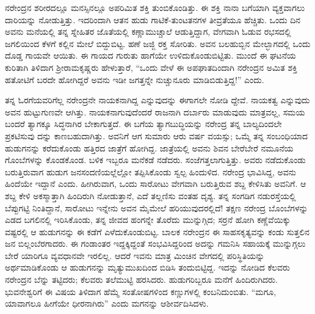 ನರೇಂದ್ರನ ಶರೀರದಲ್ಲೂ ಮನಸ್ಸಿನಲ್ಲೂ ಅಪರಿಮಿತ ಶಕ್ತಿ ತುಂಬಿಕೊಂಡಿತ್ತು. ಈ ಶಕ್ತಿ ನಾನಾ ಬಗೆಯಾಗಿ ವ್ಯಕ್ತವಾಗಲು ದಾರಿಯನ್ನು ನೋಡುತ್ತಿತ್ತು. ಇದರಿಂದಾಗಿ ಆತನ ಹುಡು ಗಾಟಿಕೆ-ತುಂಟತನಗಳ ತೀವ್ರತೆಯೂ ಹೆಚ್ಚಿತು. ಒಂದು ದಿನ ಅವನು ಮನೆಯಲ್ಲಿ ತನ್ನ ಸ್ನೇಹಿತರ ಜೊತೆಯಲ್ಲಿ ಕಣ್ಣಾಮುಚ್ಚಾಲೆ ಆಡುತ್ತಿದ್ದಾಗ, ವೇಗವಾಗಿ ಓಡುವ ರಭಸದಲ್ಲಿ ಜಗಲಿಯಿಂದ ಕೆಳಗೆ ಕಲ್ಲಿನ ಮೇಲೆ ಬಿದ್ದುಬಿಟ್ಟ. ಹಣೆ ಜಜ್ಜಿ ರಕ್ತ ಸೋರಿತು. ಅವನ ಬಲಹುಬ್ಬಿನ ಮೇಲ್ಭಾಗದಲ್ಲಿ ಒಂದು ದೊಡ್ಡ ಗಾಯವೇ ಆಯಿತು. ಈ ಗಾಯದ ಗುರುತು ಹಾಗೆಯೇ ಉಳಿದುಕೊಂಡುಬಿಟ್ಟಿತು. ಮುಂದೆ ಈ ಘಟನೆಯ ಕುರಿತಾಗಿ ತಿಳಿದಾಗ ಶ್ರೀರಾಮಕೃಷ್ಣರು ಹೇಳುತ್ತಾರೆ, “ಒಂದು ವೇಳೆ ಈ ಅಪಘಾತದಿಂದಾಗಿ ನರೇಂದ್ರನ ಅಮಿತ ಶಕ್ತಿ ಹತೋಟಿಗೆ ಬರದೇ ಹೋಗಿದ್ದರೆ ಅವನು ಇಡೀ ಜಗತ್ತನ್ನೇ ನುಚ್ಚುನೂರು ಮಾಡಿಬಿಡುತ್ತಿದ್ದ!” ಎಂದು.

ತನ್ನ ಓರಗೆಯವರಿಗೆಲ್ಲ ನರೇಂದ್ರನೇ ನಾಯಕನಾಗಿದ್ದ ಎನ್ನುವುದನ್ನು ಈಗಾಗಲೇ ನೋಡಿ ದ್ದೇವೆ. ನಾಯಕತ್ವ ಎನ್ನುವುದು ಅವನ ಹುಟ್ಟುಗುಣವೇ ಆಗಿತ್ತು. ನಾಯಕನಾಗುವುದೆಂದರೆ ರಾಜನಾಗಿ ದರ್ಬಾರು ಮಾಡುವುದು ಮಾತ್ರವಲ್ಲ, ಸಮಯ ಬಂದರೆ ತ್ಯಾಗಕ್ಕೂ ಸಿದ್ಧನಾಗಿರ ಬೇಕಾಗುತ್ತದೆ. ಈ ಬಗೆಯ ತ್ಯಾಗಬುದ್ಧಿಯನ್ನು ನರೇಂದ್ರ ತನ್ನ ಬಾಲ್ಯದಿಂದಲೇ ಪ್ರಕಟಿಸುವು ದನ್ನು ಕಾಣಬಹುದಾಗಿತ್ತು. ಅವನಿಗೆ ಆಗ ಸುಮಾರು ಆರು ವರ್ಷ ವಯಸ್ಸು; ಒಮ್ಮೆ ತನ್ನ ಸಂಬಂಧಿಯಾದ ಹುಡುಗನನ್ನು ಕರೆದುಕೊಂಡು ಹತ್ತಿರದ ಜಾತ್ರೆಗೆ ಹೋಗಿದ್ದ. ಜಾತ್ರೆಯಲ್ಲಿ ಅವನು ಶಿವನ ಬೇರೆಬೇರೆ ನಮೂನೆಯ ಗೊಂಬೆಗಳನ್ನು ಕೊಂಡಕೊಂಡ. ಬಳಿಕ ಇಬ್ಬರೂ ಮನೆಕಡೆ ನಡೆದರು. ಸಂಜೆಗತ್ತಲಾಗುತ್ತಿತ್ತು. ಅವರು ನಡೆದುಕೊಂಡು ಬರುತ್ತಿರುವಾಗ ಹುಡುಗ ಜನಸಂದಣಿಯಲ್ಲೆಲ್ಲೋ ತಪ್ಪಿಸಿಕೊಂಡು ಸ್ವಲ್ಪ ಹಿಂದುಳಿದ. ನರೇಂದ್ರ ಭಾವಿಸಿದ್ದ, ಅವನು ಹಿಂದೆಯೇ ಇದ್ದಾನೆ ಎಂದು. ಹೀಗಿರುವಾಗ, ಒಂದು ಸಾರೋಟು ವೇಗವಾಗಿ ಬರುತ್ತಿರುವ ಶಬ್ದ ಕೇಳಿಸಿತು ಅವನಿಗೆ. ಆ ಶಬ್ದ ಕೇಳಿ ಅಕಸ್ಮಾತ್ತಾಗಿ ಹಿಂದಿರುಗಿ ನೋಡುತ್ತಾನೆ, ಎದೆ ತಲ್ಲಣಿಸು ವಂತಹ ದೃಶ್ಯ. ತನ್ನ ಸಂಗಡಿಗ ನಡುರಸ್ತೆಯಲ್ಲಿ ಬೆಪ್ಪುಗಟ್ಟಿ ನಿಂತಿದ್ದಾನೆ, ಸಾರೋಟು ಇನ್ನೇನು ಅವನ ಮೈಮೇಲೆ ಹರಿಯುವುದರಲ್ಲಿದೆ! ತಕ್ಷಣ ನರೇಂದ್ರ ಬೊಂಬೆಗಳನ್ನು ಎಡದ ಬಗಲಿನಲ್ಲಿ ಇರಿಸಿಕೊಂಡು, ತನ್ನ ಜೀವದ ಹಂಗನ್ನೇ ತೊರೆದು ಮುನ್ನುಗ್ಗಿದ; ಸರ್ರನೆ ಹೋಗಿ ಕಣ್ಣೆವೆಯಿಕ್ಕು ವಷ್ಟರಲ್ಲಿ ಆ ಹುಡುಗನನ್ನು ಈ ಕಡೆಗೆ ಎಳೆದುಕೊಂಡುಬಿಟ್ಟ. ಬಾಲಕ ನರೇಂದ್ರನ ಈ ಸಾಹಸಕೃತ್ಯವನ್ನು ಕಂಡು ಸುತ್ತಲಿನ ಜನ ಬಿಲ್ಲಂಬೆರಗಾದರು. ಈ ಗಂಡಾಂತರ ಇದ್ದಕ್ಕಿದ್ದಂತೆ ಸಂಭವಿಸಿದ್ದರಿಂದ ಅದನ್ನು ಗಮನಿಸಿ ಸಹಾಯಕ್ಕೆ ಮುನ್ನುಗ್ಗಲು ಬೇರೆ ಯಾರಿಗೂ ವ್ಯವಧಾನವೇ ಇರಲಿಲ್ಲ. ಆದರೆ ಇವನು ಮಾತ್ರ ಮಿಂಚಿನ ವೇಗದಲ್ಲಿ ಪರಿಸ್ಥಿತಿಯನ್ನು ಅರ್ಥಮಾಡಿಕೊಂಡು ಆ ಹುಡುಗನನ್ನು ಮೃತ್ಯುಮುಖದಿಂದ ಬಿಡಿಸಿ ತಂದುಬಿಟ್ಟಿದ್ದ. ಇದನ್ನು ನೋಡಿದ ಕೆಲವರು ನರೇಂದ್ರನ ಬೆನ್ನು ತಟ್ಟಿದರು; ಕೆಲವರು ತಲೆಮುಟ್ಟಿ ಹರಸಿದರು. ಹುಡುಗರಿಬ್ಬರೂ ಮನೆಗೆ ಹಿಂದಿರುಗಿದರು. ಭುವನೇಶ್ವರಿಗೆ ಈ ವಿಷಯ ತಿಳಿದಾಗ ಹೆಮ್ಮೆ ಸಂತೋಷಗಳಿಂದ ಕಣ್ಣುಗಳಲ್ಲಿ ಕಂಬನಿದುಂಬಿತು. “ಮಗೂ, ಯಾವಾಗಲೂ ಹೀಗೆಯೇ ಧೀರನಾಗಿರು” ಎಂದು ಮಗನನ್ನು ಆಶೀರ್ವದಿಸಿದಳು.

